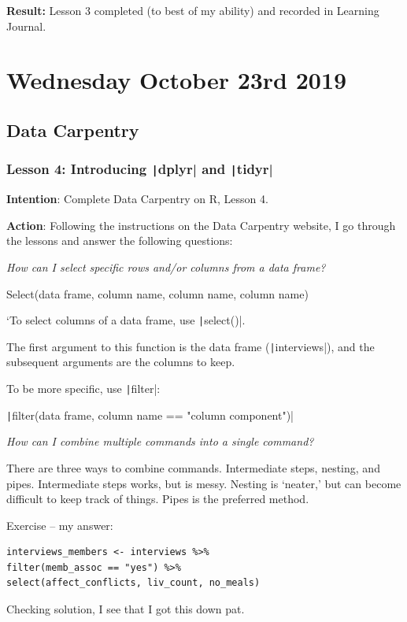 \documentclass{article}
\begin{document}
\textbf{Result:} Lesson 3 completed (to best of my ability) and recorded in Learning Journal.

\newpage
\section{Wednesday October 23rd 2019}

\subsection{Data Carpentry}

\subsubsection{Lesson 4: Introducing \texttt|dplyr| and \texttt|tidyr|}

\textbf{Intention}: Complete Data Carpentry on R, Lesson 4.

\textbf{Action}: Following the instructions on the Data Carpentry website, I go through the lessons and answer the following questions:

\textit{How can I select specific rows and/or columns from a data frame?}

Select(data frame, column name, column name, column name)

`To select columns of a data frame, use \texttt|select()|.

The first argument to this function is the data frame (\texttt|interviews|), and the subsequent arguments are the columns to keep.

To be more specific, use \texttt|filter|:

\texttt|filter(data frame, column name == "column component")|

\textit{How can I combine multiple commands into a single command?}

There are three ways to combine commands.
Intermediate steps, nesting, and pipes.
Intermediate steps works, but is messy.
Nesting is ‘neater,’ but can become difficult to keep track of things.
Pipes is the preferred method.

Exercise – my answer: 

\begin{verbatim}
interviews_members <- interviews %>%
filter(memb_assoc == "yes") %>%
select(affect_conflicts, liv_count, no_meals)
\end{verbatim}

{\item Checking solution, I see that I got this down pat.}
\end{document}
